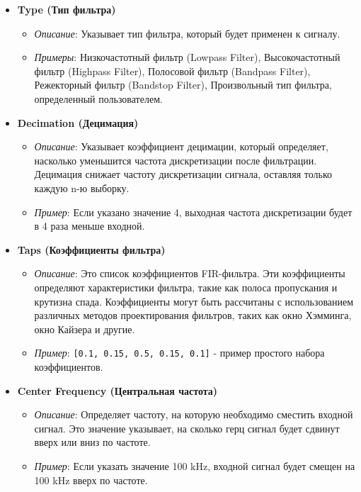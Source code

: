 \documentclass[a4paper,12pt]{extarticle}
\begin{document}
\begin{itemize}
    
    \item \textbf{Type (Тип фильтра)}
    \begin{itemize}
        \item \textit{Описание}: Указывает тип фильтра, который будет применен к сигналу.
        \item \textit{Примеры}: Низкочастотный фильтр (Lowpass Filter), Высокочастотный фильтр (Highpass Filter), Полосовой фильтр (Bandpass Filter), Режекторный фильтр (Bandstop Filter), Произвольный тип фильтра, определенный пользователем.
    \end{itemize}

    \item \textbf{Decimation (Децимация)}
    \begin{itemize}
        \item \textit{Описание}: Указывает коэффициент децимации, который определяет, насколько уменьшится частота дискретизации после фильтрации. Децимация снижает частоту дискретизации сигнала, оставляя только каждую n-ю выборку.
        \item \textit{Пример}: Если указано значение 4, выходная частота дискретизации будет в 4 раза меньше входной.
    \end{itemize}

    \item \textbf{Taps (Коэффициенты фильтра)}
    \begin{itemize}
        \item \textit{Описание}: Это список коэффициентов FIR-фильтра. Эти коэффициенты определяют характеристики фильтра, такие как полоса пропускания и крутизна спада. Коэффициенты могут быть рассчитаны с использованием различных методов проектирования фильтров, таких как окно Хэмминга, окно Кайзера и другие.
        \item \textit{Пример}: \texttt{[0.1, 0.15, 0.5, 0.15, 0.1]} - пример простого набора коэффициентов.
    \end{itemize}

    \item \textbf{Center Frequency (Центральная частота)}
    \begin{itemize}
        \item \textit{Описание}: Определяет частоту, на которую необходимо сместить входной сигнал. Это значение указывает, на сколько герц сигнал будет сдвинут вверх или вниз по частоте.
        \item \textit{Пример}: Если указать значение 100 kHz, входной сигнал будет смещен на 100 kHz вверх по частоте.
    \end{itemize}


\end{itemize}
\end{document}

